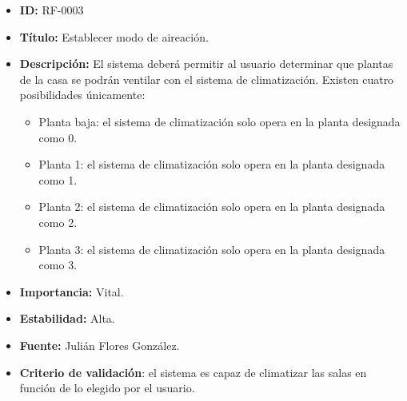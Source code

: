 \begin{itemize}
    \item \textbf{ID:} RF-0003
    \item \textbf{Título:} Establecer modo de aireación.
    \item \textbf{Descripción:} El sistema deberá permitir al usuario determinar que plantas de la casa se podrán ventilar con el sistema de climatización. Existen cuatro posibilidades únicamente:
          \begin{itemize}
              \item Planta baja: el sistema de climatización solo opera en la planta designada como 0.
              \item Planta 1: el sistema de climatización solo opera en la planta designada como 1.
              \item Planta 2: el sistema de climatización solo opera en la planta designada como 2.
              \item Planta 3: el sistema de climatización solo opera en la planta designada como 3.
          \end{itemize}
    \item \textbf{Importancia:} Vital.
    \item \textbf{Estabilidad:} Alta.
    \item \textbf{Fuente:} Julián Flores González.
    \item \textbf{Criterio de validación}: el sistema es capaz de climatizar las salas en función de lo elegido por el usuario.
\end{itemize}



